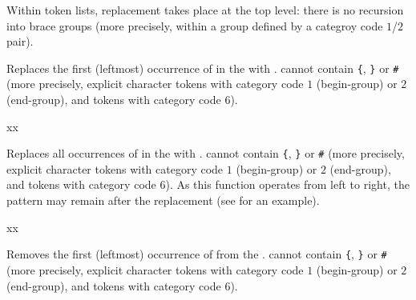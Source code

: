 \documentclass[oneside]{book}
\begin{document}
Within token lists, replacement takes place at the top level: there is
no recursion into brace groups (more precisely, within a group defined by
a categroy code $1$/$2$ pair).

\begin{function}{\TlVarReplaceOnce}
\begin{syntax}
   
\end{syntax}
Replaces the first (leftmost) occurrence of  in the
 with . 
cannot contain \verb|{|, \verb|}| or \verb|#|
(more precisely, explicit character tokens with category code $1$
(begin-group) or $2$ (end-group), and tokens with category code $6$).
\begin{demohigh}
\TlSet {}
\TlVarReplaceOnce {} {xx}
\TlUse \lTmpaTl
\end{demohigh}
\end{function}

\begin{function}{\TlVarReplaceAll}
\begin{syntax}
   
\end{syntax}
Replaces all occurrences of  in the
 with . 
cannot contain \verb|{|, \verb|}| or \verb|#|
(more precisely, explicit character tokens with category code $1$
(begin-group) or $2$ (end-group), and tokens with category code $6$).
As this function
operates from left to right, the pattern 
may remain after the replacement (see  for an example).
\begin{demohigh}
\TlSet {}
\TlVarReplaceAll {} {xx}
\TlUse \lTmpaTl
\end{demohigh}
\end{function}

\begin{function}{\TlVarRemoveOnce}
\begin{syntax}
  
\end{syntax}
Removes the first (leftmost) occurrence of  from the
.  cannot contain \verb|{|, \verb|}| or \verb|#|
(more precisely, explicit character tokens with category code $1$
(begin-group) or $2$ (end-group), and tokens with category code $6$).
\begin{demohigh}
\TlSet {}
\TlVarRemoveOnce {}
\TlUse \lTmpaTl
\end{demohigh}
\end{function}
\end{document}
